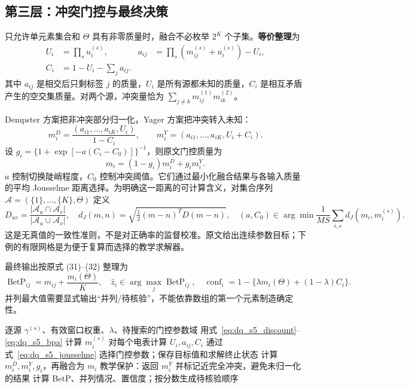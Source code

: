 \subsection{第三层：冲突门控与最终决策}

只允许单元素集合和 $\Theta$ 具有非零质量时，融合不必枚举 $2^K$ 个子集。\textbf{等价整理}为
\begin{align}
 U_i&=\prod_su_i^{(s)},&
 a_{ij}&=\prod_s(m_{ij}^{(s)}+u_i^{(s)})-U_i,\\
 C_i&=1-U_i-\sum_ja_{ij}.&&
 \label{eq:dq_s5_conjunctive}
\end{align}
其中 $a_{ij}$ 是相交后只剩标签 $j$ 的质量，$U_i$ 是所有源都未知的质量，$C_i$ 是相互矛盾产生的空交集质量。对两个源，冲突量恰为 $\sum_{j\ne k}m_{ij}^{(1)}m_{ik}^{(2)}$。

Dempster 方案把非冲突部分归一化，Yager 方案把冲突转入未知：
\begin{equation}
 m_i^D=\frac{(a_{i1},\ldots,a_{iK},U_i)}{1-C_i},\qquad
 m_i^Y=(a_{i1},\ldots,a_{iK},U_i+C_i).
 \label{eq:dq_s5_dy}
\end{equation}
设 $g_i=\{1+\exp[-a(C_i-C_0)]\}^{-1}$，则原文门控质量为
\begin{equation}
 m_i=(1-g_i)m_i^D+g_im_i^Y.
 \label{eq:dq_s5_gate}
\end{equation}
$a$ 控制切换陡峭程度，$C_0$ 控制冲突阈值。它们通过最小化融合结果与各输入质量的平均 Jousselme 距离选择。为明确这一距离的可计算含义，对集合序列
$\mathcal A=(\{1\},\ldots,\{K\},\Theta)$ 定义
\begin{equation}
 D_{uv}=\frac{|\mathcal A_u\cap\mathcal A_v|}{|\mathcal A_u\cup\mathcal A_v|},\quad
 d_J(m,n)=\sqrt{\tfrac12(m-n)^TD(m-n)},\quad
 (a,C_0)\in\arg\min\frac1{MS}\sum_{i,s}d_J(m_i,m_i^{(s)}).
 \label{eq:dq_s5_jousselme}
\end{equation}
这是无真值的一致性准则，不是对正确率的监督校准。原文给出连续参数目标；下例的有限网格是为便于复算而选择的教学求解器。

最终输出按原式 (31)--(32) 整理为
\begin{equation}
 \operatorname{BetP}_{ij}=m_{ij}+\frac{m_i(\Theta)}K,\quad
 \hat z_i\in\arg\max_j\operatorname{BetP}_{ij},\quad
 \operatorname{conf}_i=1-\{\lambda m_i(\Theta)+(1-\lambda)C_i\}.
 \label{eq:dq_s5_output}
\end{equation}
并列最大值需要显式输出“并列/待核验”，不能依靠数组的第一个元素制造确定性。

\begin{algorithm}[tbp]
\caption{S5 的证据融合：原计算链与可执行边界处理}
\begin{algorithmic}[1]
\Require 逐源 $\gamma^{(s)}$、有效窗口权重、$\lambda$、待搜索的门控参数域
 \State 用式~\eqref{eq:dq_s5_discount}--\eqref{eq:dq_s5_bpa} 计算 $m_i^{(s)}$
\EndFor
\State 对每个电表计算 $U_i,a_{ij},C_i$
\State 通过式~\eqref{eq:dq_s5_jousselme} 选择门控参数；保存目标值和求解终止状态
   \State 计算 $m_i^D,m_i^Y,g_i$，再融合为 $m_i$
 \Else
   \State 教学保护：返回 $m_i^Y$ 并标记近完全冲突，避免未归一化的结果
 \EndIf
 \State 计算 BetP、并列情况、置信度；按分数生成待核验顺序
\EndFor
\end{algorithmic}
\end{algorithm}

